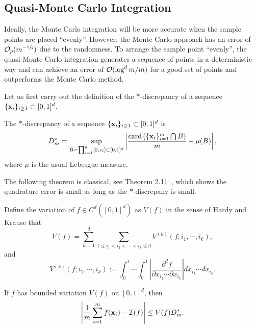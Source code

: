 \subsection{Quasi-Monte Carlo Integration}
Ideally, the Monte Carlo integration will be more accurate when the sample points are placed ``evenly''. However, the Monte Carlo approach has an error of $\mathcal O_p(m^{-\sfrac{1}{2}})$ due to the randomness. To arrange the sample point ``evenly'', the quasi-Monte Carlo integration generates a sequence of points in a deterministic way and can achieve an error of $\mathcal O(\log^d m/m)$ for a good set of points and outperforms the Monte Carlo method.
 
Let us first carry out the definition of the $\ast$-discrepancy of a sequence $\{\mathbf x_i\}_{i\ge 1}\subset [0, 1]^d$.
\begin{definition}
The $\ast$-discrepancy of a sequence $\{\mathbf x_i\}_{i\ge 1}\subset [0, 1]^d$ is 
    $$D_m^{\ast} = \sup_{B = \prod_{i=1}^d [0, z_i]\subset [0, 1]^d} \left|\frac{\textrm{card}\left( \{\mathbf x_i\}_{i=1}^m \bigcap B\right)}{m} - \mu(B) \right|, $$
where $\mu$ is the usual Lebesgue measure.
\end{definition}
 The following theorem is classical, see Theorem 2.11~\cite{niederreiter1992random}, which shows the quadrature error is small as long as the $\ast$-discrepany is small.  
 \begin{definition}
     Define the variation of $f\in C^d([0, 1]^d)$ as $V(f)$ in the sense of Hardy and Krause that 
     \begin{equation}
         V(f) = \sum_{k=1}^d \sum_{1\le i_1 < i_2 <\cdots < i_k \le d} V^{(k)}(f; i_1,\cdots, i_k),
     \end{equation}
     and
     \begin{equation}
         V^{(k)}(f; i_1,\cdots, i_k) := \int_0^1 \cdots \int_0^1 \left|\frac{\partial^d f}{\partial x_{i_1}\cdots \partial x_{i_k}}\right| dx_{i_1} \cdots d x_{i_k}. 
     \end{equation}
 \end{definition}
\begin{theorem}
    If $f$ has bounded variation $V(f)$ on $[0, 1]^d$, then 
    \begin{equation}
        \left|\frac{1}{m} \sum_{i=1}^m f(\mathbf x_i) - \mathcal I(f) \right|\le V(f) D^{\ast}_m. 
    \end{equation}
\end{theorem}
